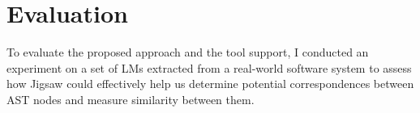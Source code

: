 \section{Evaluation}\label{jigsaw-assessment}
%
%
%
%
To evaluate the proposed approach and the tool support, I conducted an experiment on a set of LMs extracted from a real-world software system to assess how Jigsaw could effectively help us determine potential correspondences between AST nodes and measure similarity between them.






